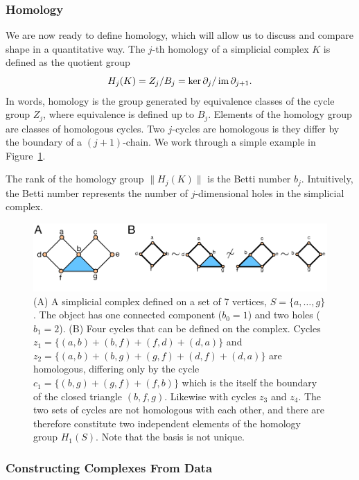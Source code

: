 \subsubsection{Homology}
\label{bg:tda:math:homology}

We are now ready to define homology, which will allow us to discuss and compare shape in a quantitative way.
The $j$-th homology of a simplicial complex $K$ is defined as the quotient group
\begin{equation}
H_{j}(K) = Z_{j} / B_{j} = \ker\partial_{j} / \operatorname{im}\partial_{j+1}.
\end{equation}
In words, homology is the group generated by equivalence classes of the cycle group $Z_{j}$, where equivalence is defined up to $B_{j}$.
Elements of the homology group are classes of homologous cycles.
Two $j$-cycles are homologous is they differ by the boundary of a $(j+1)$-chain.
We work through a simple example in Figure~\ref{fig:bg:homology_example}.

The rank of the homology group $\|H_{j}(K)\|$ is the Betti number $b_j$.
Intuitively, the Betti number represents the number of $j$-dimensional holes in the simplicial complex.

\begin{figure}
\centering
\includegraphics[]{./fig/background/homology_example.pdf}
\caption[Simplicial Homology]{(A) A simplicial complex defined on a set of 7 vertices, $S=\{a,\ldots,g\}$. The object has one connected component ($b_0=1$) and two holes ($b_1=2$). (B) Four cycles that can be defined on the complex. Cycles $z_1=\{(a,b)+(b,f)+(f,d)+(d,a)\}$ and $z_2=\{(a,b)+(b,g)+(g,f)+(d,f)+(d,a)\}$ are homologous, differing only by the cycle $c_1=\{(b,g)+(g,f)+(f,b)\}$ which is the itself the boundary of the closed triangle $(b,f,g)$. Likewise with cycles $z_3$ and $z_4$. The two sets of cycles are not homologous with each other, and there are therefore constitute two independent elements of the homology group $H_1(S)$. Note that the basis is not unique.}
\label{fig:bg:homology_example}
\end{figure}

\subsubsection{Constructing Complexes From Data}
\label{bg:tda:math:complexes}

